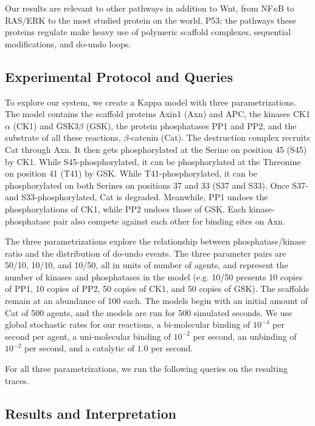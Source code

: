 Our results are relevant to other pathways in addition to Wnt, from
NF$\kappa$B to RAS/ERK to the most studied protein on the world, P53;
the pathways these proteins regulate make heavy use of polymeric
scaffold complexes, sequential modifications, and do-undo loops.




\subsection{Experimental Protocol and Queries}

To explore our system, we create a Kappa model with three
parametrizations. The model contains the scaffold proteins Axin1 (Axn)
and APC, the kinases CK1$\alpha$ (CK1) and GSK3$\beta$ (GSK), the
protein phosphatases PP1 and PP2, and the substrate of all these
reactions, $\beta$-catenin (Cat). The destruction complex recruits
Cat through Axn. It then gets phosphorylated at the Serine on position
45 (S45) by CK1. While S45-phosphorylated, it can be phosphorylated at
the Threonine on position 41 (T41) by GSK. While T41-phosphorylated,
it can be phosphorylated on both Serines on positions 37 and 33 (S37 and
S33). Once S37- and S33-phosphorylated, Cat is degraded. Meanwhile, PP1
undoes the phosphorylations of CK1, while PP2 undoes those of GSK. Each
kinase-phosphatase pair also compete against each other for binding sites
on Axn.

The three parametrizations explore the relationship
between phosphatase/kinase ratio and the distribution of do-undo
events. The three parameter pairs are 50/10, 10/10, and
10/50, all in units of number of agents, and represent the number of kinases and
phosphatases in the model (e.g. 10/50 presents 10 copies of PP1, 10
copies of PP2, 50 copies of CK1, and 50 copies of GSK). The scaffolds
remain at an abundance of 100 each. The models begin with an initial
amount of Cat of 500 agents, and the models are run for 500
simulated seconds. We use global stochastic rates for our reactions, a bi-molecular binding of $10^{-4}$ per second per agent, a uni-molecular binding of $10^{-2}$ per second, an unbinding of $10^{-2}$ per second, and a catalytic of $1.0$ per second.

For all three parametrizations, we run the following queries on the
resulting traces.




\subsection{Results and Interpretation}

